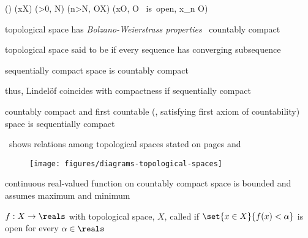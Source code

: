 \documentclass[17pt,landscape]{foils}
\begin{document}
{{	\begin{leqn}
		(\forall {})
		(\exists x\in X)
		(\forall \epsilon>0, N\in\naturals)
		(\exists n>N, O\subset X)
		(x\in O, O \mbox{ is open}, x_n \in O)
	\end{leqn}

	\vitem topological space has \emph{Bolzano-Weierstrass properties} \iaoi\ countably compact

	\vitem topological space said to be 
		if every sequence has converging subsequence

	\vitem sequentially compact space is countably compact

	\vitem thus, Lindel\"of coincides with compactness if sequentially compact

	\vvitem countably compact and first countable (\ie, satisfying first axiom of countability) space
		is sequentially compact%
\eit


%

\bit
	\item {}\
		shows relations among topological spaces stated on pages
		\pageref{page:Countable-compactness-and-Lindelof}
		and
		\pageref{page:Bolzano-Weierstrass-property-and-sequential-compactness}
\eit

\vfill
\begin{figure}
\begin{center}
	\mypsfrag{compact}{compact}
		\texttt{[image: figures/diagrams-topological-spaces]}
		\label{fig:diagrams for relations among topological spaces}
\end{center}
\end{figure}



\bit
	\item continuous real-valued function on countably compact space
		is bounded and assumes maximum and minimum

	\vitem $f:X\to\reals$ with topological space, $X$,
		called 
		if $\set{x\in X}{f(x)<\alpha}$ is open for every $\alpha \in \reals$

}}
\end{document}
